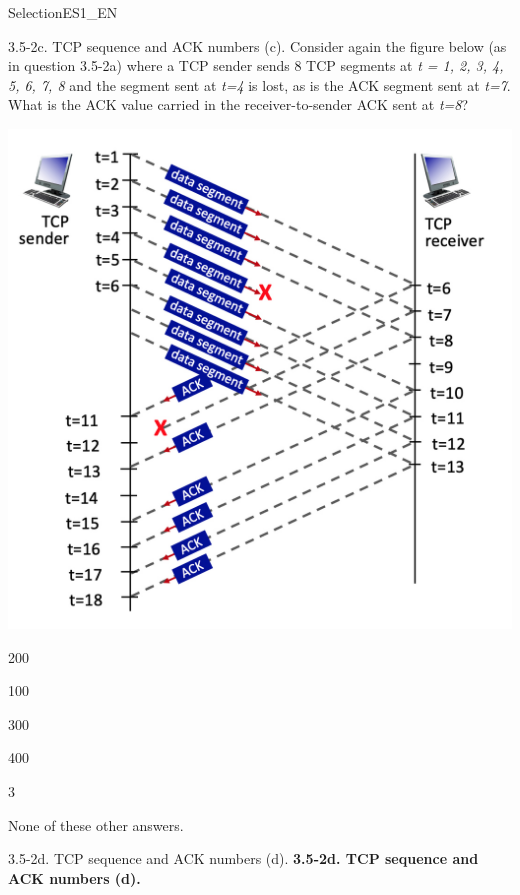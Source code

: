 \documentclass[a4paper]{article}
\begin{document}
\begin{quiz}{SelectionES1\_EN}
\begin{multi}[points=1,shuffle]{3.5-2c. TCP sequence and ACK numbers (c).}
Consider again the figure below (as in question 3.5-2a) where a TCP sender sends 8 TCP segments at \emph{t = 1, 2, 3, 4, 5, 6, 7, 8} and the segment sent at \emph{t=4} is lost, as is the ACK segment sent at \emph{t=7}. What is the ACK value carried in the receiver-to-sender ACK sent at \emph{t=8}?
\begin{center}
	\includegraphics[width=\linewidth]{figs/tcp_seq_ack_1.jpg}
\end{center}
\item 200
\item 100
\item* 300
\item 400
\item 3
\item None of these other answers.
\end{multi}

\begin{multi}[points=1,shuffle]{3.5-2d. TCP sequence and ACK numbers (d).}
\textbf{3.5-2d. TCP sequence and ACK numbers (d).}


\end{multi}
\end{quiz}
\end{document}
